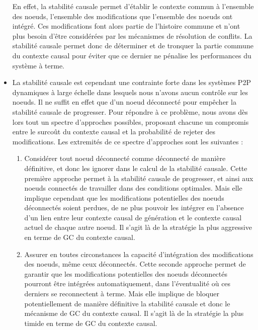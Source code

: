 \begin{itemize}
        En effet, la stabilité causale permet d'établir le contexte commun à l'ensemble des noeuds, \ie l'ensemble des modifications que l'ensemble des noeuds ont intégré.
        Ces modifications font alors partie de l'histoire commune et n'ont plus besoin d'être considérées par les mécanismes de résolution de conflits.
        La stabilité causale permet donc de déterminer et de tronquer la partie commune du contexte causal pour éviter que ce dernier ne pénalise les performances du système à terme.
    \item La stabilité causale est cependant une contrainte forte dans les systèmes \ac{P2P} dynamiques à large échelle dans lesquels nous n'avons aucun contrôle sur les noeuds.
        Il ne suffit en effet que d'un noeud déconnecté pour empêcher la stabilité causale de progresser.
        Pour répondre à ce problème, nous avons dès lors tout un spectre d'approches possibles, proposant chacune un compromis entre le surcoût du contexte causal et la probabilité de rejeter des modifications.
        Les extremités de ce spectre d'approches sont les suivantes :
        \begin{enumerate}
            \item Considérer tout noeud déconnecté comme déconnecté de manière définitive, et donc les ignorer dans le calcul de la stabilité causale.
                Cette première approche permet à la stabilité causale de progresser, et ainsi aux noeuds connectés de travailler dans des conditions optimales.
                Mais elle implique cependant que les modifications potentielles des noeuds déconnectés soient perdues, \ie de ne plus pouvoir les intégrer en l'absence d'un lien entre leur contexte causal de génération et le contexte causal actuel de chaque autre noeud.
                Il s'agit là de la stratégie la plus aggressive en terme de \ac{GC} du contexte causal.
            \item Assurer en toutes circonstances la capacité d'intégration des modifications des noeuds, même ceux déconnectés.
                Cette seconde approche permet de garantir que les modifications potentielles des noeuds déconnectés pourront être intégrées automatiquement, dans l'éventualité où ces derniers se reconnectent à terme.
                Mais elle implique de bloquer potentiellement de manière définitive la stabilité causale et donc le mécanisme de \ac{GC} du contexte causal.
                Il s'agit là de la stratégie la plus timide en terme de \ac{GC} du contexte causal.
        \end{enumerate}

\end{itemize}
